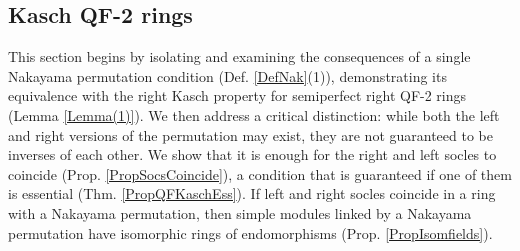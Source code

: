 \documentclass[11pt]{article}
\theoremstyle{plain}
\theoremstyle{remark}
\theoremstyle{plain}
\begin{document}
\subsection{Kasch QF-2 rings}\label{SecDefKasch}

This section begins by isolating and examining the consequences of a single Nakayama permutation condition (Def. \ref{DefNak}(1)), demonstrating its equivalence with the right Kasch property for semiperfect right QF-2 rings (Lemma \ref{Lemma(1)}).  We then address a critical distinction: while both the left and right versions of the permutation may exist, they are not guaranteed to be inverses of each other. We show that it is enough for the right and left socles to coincide (Prop. \ref{PropSocsCoincide}), a condition that is guaranteed if one of them is essential  (Thm. \ref{PropQFKaschEss}). If left and right socles coincide in a ring with a Nakayama permutation, then simple modules linked by a Nakayama permutation have isomorphic rings of endomorphisms (Prop. \ref{PropIsomfields}).

\smallskip 
\end{document}
